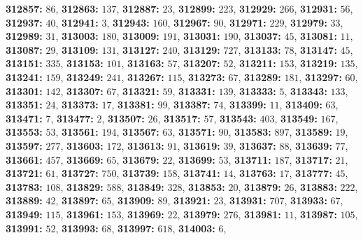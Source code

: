 \textsf{\bfseries 312857:} $86$, \textsf{\bfseries 312863:} $137$, \textsf{\bfseries 312887:} $23$, \textsf{\bfseries 312899:} $223$, \textsf{\bfseries 312929:} $266$, \textsf{\bfseries 312931:} $56$, \textsf{\bfseries 312937:} $40$, \textsf{\bfseries 312941:} $3$, \textsf{\bfseries 312943:} $160$, \textsf{\bfseries 312967:} $90$, \textsf{\bfseries 312971:} $229$, \textsf{\bfseries 312979:} $33$, \textsf{\bfseries 312989:} $31$, \textsf{\bfseries 313003:} $180$, \textsf{\bfseries 313009:} $191$, \textsf{\bfseries 313031:} $190$, \textsf{\bfseries 313037:} $45$, \textsf{\bfseries 313081:} $11$, \textsf{\bfseries 313087:} $29$, \textsf{\bfseries 313109:} $131$, \textsf{\bfseries 313127:} $240$, \textsf{\bfseries 313129:} $727$, \textsf{\bfseries 313133:} $78$, \textsf{\bfseries 313147:} $45$, \textsf{\bfseries 313151:} $335$, \textsf{\bfseries 313153:} $101$, \textsf{\bfseries 313163:} $57$, \textsf{\bfseries 313207:} $52$, \textsf{\bfseries 313211:} $153$, \textsf{\bfseries 313219:} $135$, \textsf{\bfseries 313241:} $159$, \textsf{\bfseries 313249:} $241$, \textsf{\bfseries 313267:} $115$, \textsf{\bfseries 313273:} $67$, \textsf{\bfseries 313289:} $181$, \textsf{\bfseries 313297:} $60$, \textsf{\bfseries 313301:} $142$, \textsf{\bfseries 313307:} $67$, \textsf{\bfseries 313321:} $59$, \textsf{\bfseries 313331:} $139$, \textsf{\bfseries 313333:} $5$, \textsf{\bfseries 313343:} $133$, \textsf{\bfseries 313351:} $24$, \textsf{\bfseries 313373:} $17$, \textsf{\bfseries 313381:} $99$, \textsf{\bfseries 313387:} $74$, \textsf{\bfseries 313399:} $11$, \textsf{\bfseries 313409:} $63$, \textsf{\bfseries 313471:} $7$, \textsf{\bfseries 313477:} $2$, \textsf{\bfseries 313507:} $26$, \textsf{\bfseries 313517:} $57$, \textsf{\bfseries 313543:} $403$, \textsf{\bfseries 313549:} $167$, \textsf{\bfseries 313553:} $53$, \textsf{\bfseries 313561:} $194$, \textsf{\bfseries 313567:} $63$, \textsf{\bfseries 313571:} $90$, \textsf{\bfseries 313583:} $897$, \textsf{\bfseries 313589:} $19$, \textsf{\bfseries 313597:} $277$, \textsf{\bfseries 313603:} $172$, \textsf{\bfseries 313613:} $91$, \textsf{\bfseries 313619:} $39$, \textsf{\bfseries 313637:} $88$, \textsf{\bfseries 313639:} $77$, \textsf{\bfseries 313661:} $457$, \textsf{\bfseries 313669:} $65$, \textsf{\bfseries 313679:} $22$, \textsf{\bfseries 313699:} $53$, \textsf{\bfseries 313711:} $187$, \textsf{\bfseries 313717:} $21$, \textsf{\bfseries 313721:} $61$, \textsf{\bfseries 313727:} $750$, \textsf{\bfseries 313739:} $158$, \textsf{\bfseries 313741:} $14$, \textsf{\bfseries 313763:} $17$, \textsf{\bfseries 313777:} $45$, \textsf{\bfseries 313783:} $108$, \textsf{\bfseries 313829:} $588$, \textsf{\bfseries 313849:} $328$, \textsf{\bfseries 313853:} $20$, \textsf{\bfseries 313879:} $26$, \textsf{\bfseries 313883:} $222$, \textsf{\bfseries 313889:} $42$, \textsf{\bfseries 313897:} $65$, \textsf{\bfseries 313909:} $89$, \textsf{\bfseries 313921:} $23$, \textsf{\bfseries 313931:} $707$, \textsf{\bfseries 313933:} $67$, \textsf{\bfseries 313949:} $115$, \textsf{\bfseries 313961:} $153$, \textsf{\bfseries 313969:} $22$, \textsf{\bfseries 313979:} $276$, \textsf{\bfseries 313981:} $11$, \textsf{\bfseries 313987:} $105$, \textsf{\bfseries 313991:} $52$, \textsf{\bfseries 313993:} $68$, \textsf{\bfseries 313997:} $618$, \textsf{\bfseries 314003:} $6$, 
